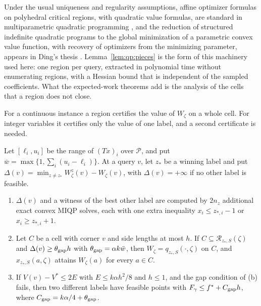 Under the usual uniqueness and regularity assumptions, affine optimizer
formulas on polyhedral critical regions, with quadratic value formulas, are
standard in multiparametric quadratic programming
\cite{bemporad2002-the-explicit-linear-quadratic-regulator,tndel2003-an-algorithm-for-multi-parametric,patrinos2011-convex-parametric-piecewise-quadratic-optimization},
and the reduction of structured indefinite quadratic programs to the global
minimization of a parametric convex value function, with recovery of
optimizers from the minimizing parameter, appears in Ding's thesis
\cite{ding1996-a-parametric-solution-for-local}. Lemma~\ref{lem:qp:pieces}
is the form of this machinery used here: one region per query, extracted in
polynomial time without enumerating regions, with a Hessian bound that is
independent of the sampled coefficients. What the expected-work theorems add
is the analysis of the cells that a region does not close.

For a continuous instance a region certifies the value of $W_\zeta$ on a
whole cell. For integer variables it certifies only the value of one label,
and a second certificate is needed.

\begin{lemma}\label{lem:qp:gap}
Let $[\ell_i,u_i]$ be the range of $(Tx)_i$ over $\mathcal P$, and put
$\bar w=\max\{1,\sum_i(u_i-\ell_i)\}$. At a query $v$, let $z_*$ be a winning
label and put $\Delta(v)=\min_{z\ne z_*}W^z_\zeta(v)-W_\zeta(v)$, with
$\Delta(v)=+\infty$ if no other label is feasible.
\begin{enumerate}[label=(\alph*)]
\item $\Delta(v)$ and a witness of the best other label are computed by $2n_z$
 additional exact convex MIQP solves, each with one extra inequality
 $x_i\le z_{*,i}-1$ or $x_i\ge z_{*,i}+1$.
\item Let $C$ be a cell with corner $v$ and side lengths at most $h$. If
 $C\subseteq\mathcal R_{z_*,S}(\zeta)$ and $\Delta(v)\ge\theta_{\rm gap}h$
 with $\theta_{\rm gap}=\alpha k\bar w$, then $W_\zeta=q_{z_*,S}(\cdot,\zeta)$
 on $C$, and $x_{z_*,S}(a,\zeta)$ attains $W_\zeta(a)$ for every $a\in C$.
\item If $V(v)-V^*\le2E$ with $E\le k\alpha h^2/8$ and $h\le1$, and the gap
 condition of (b) fails, then two different labels have feasible points with
 $F_\gamma\le f^*+C_{\rm gap}h$, where $C_{\rm gap}=k\alpha/4+\theta_{\rm gap}$.
\end{enumerate}
\end{lemma}

